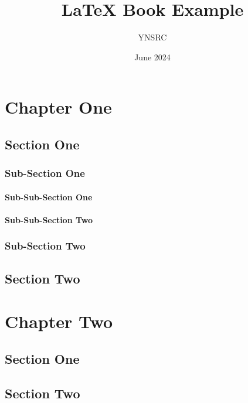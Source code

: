\documentclass[12pt, twoside]{book}
\title{\LaTeX{} Book Example}
\author{YNSRC}
\date{June 2024}
\begin{document}
\maketitle
\tableofcontents

\chapter{Chapter One}

\section{Section One}
\blindtext[2]

\subsection{Sub-Section One}
\blindtext[3]

\subsubsection{Sub-Sub-Section One}
\blindtext[4]

\subsubsection{Sub-Sub-Section Two}
\blindtext[2]

\subsection{Sub-Section Two}
\blindtext[2]

\section{Section Two}
\blindtext

\chapter{Chapter Two}

\section{Section One}
\blindtext[3]

\section{Section Two}
\blindtext
\end{document}
